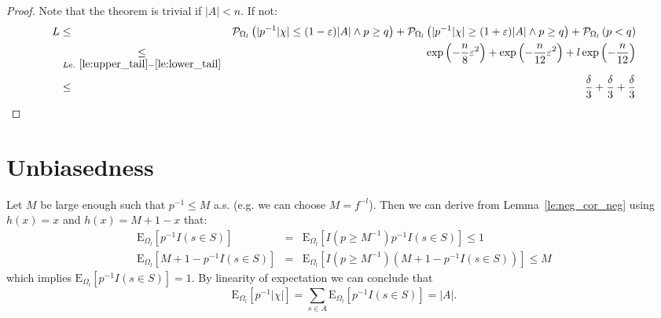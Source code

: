\documentclass{article}
\newcommand{\prob}{\mathcal P}
\newcommand{\expectation}{\mathrm{E}}
\newcommand{\eps}{\varepsilon}
\theoremstyle{definition}
\begin{document}
\begin{proof}
Note that the theorem is trivial if $|A| < n$. If not:
\begin{eqnarray*}
  L & \leq & \prob_{\Omega_l} \left( | p^{-1} |\chi| \leq (1-\eps) |A| \wedge p \geq q \right) +
    \prob_{\Omega_l} \left( | p^{-1} |\chi| \geq (1+\eps) |A| \wedge p \geq q \right) +
    \prob_{\Omega_l} \left( p < q \right) \\
    & \underset{Le.~\ref{le:upper_tail}-\ref{le:lower_tail}}{\leq} &
    \exp\left( - \frac{n}{8} \eps^2 \right)  + \exp\left( - \frac{n}{12} \eps^2 \right) + l \exp\left( - \frac{n}{12} \right) \\
    & \leq & \frac{\delta}{3} + \frac{\delta}{3} + \frac{\delta}{3}
\end{eqnarray*}
\end{proof}

\section{Unbiasedness}
Let $M$ be large enough such that $p^{-1} \leq M$ a.s. (e.g. we can choose $M = f^{-l}$). Then we can derive from Lemma~\ref{le:neg_cor_neg} using $h(x) = x$ and $h(x) = M+1-x$ that:
\begin{eqnarray*}
  \expectation_{\Omega_l} [ p^{-1} I(s \in S) ] & = & \expectation_{\Omega_l} [ I(p \geq M^{-1}) p^{-1} I(s \in S) ] \leq 1 \\
  \expectation_{\Omega_l} [ M + 1 - p^{-1} I(s \in S) ] & = & \expectation_{\Omega_l} [ I(p \geq M^{-1}) (M + 1 - p^{-1} I(s \in S)) ] \leq M  
\end{eqnarray*}
which implies $\expectation_{\Omega_l} [ p^{-1} I(s \in S) ] = 1$.
By linearity of expectation we can conclude that
\[
  \expectation_{\Omega_l} [ p^{-1} |\chi| ] = \sum_{s \in A} \expectation_{\Omega_l} [ p^{-1} I(s \in S) ] = |A| \textrm{.}
\]


 
\end{document}
